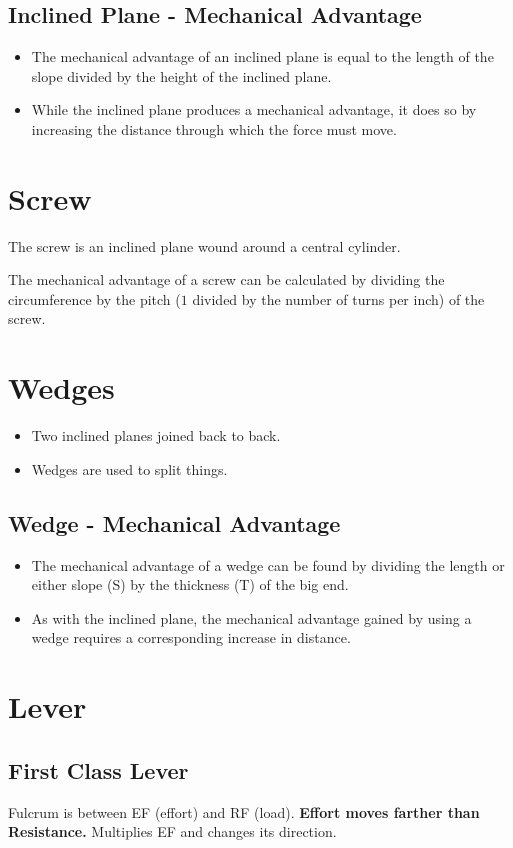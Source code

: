 \documentclass[12pt]{scrartcl}
\begin{document}
\subsection{Inclined Plane - Mechanical Advantage}
\begin{itemize}
    \item The mechanical advantage of an inclined plane is equal to the length of the slope divided by the height of the inclined plane.
    \item While the inclined plane produces a mechanical advantage, it does so by increasing the distance through which the force must move.
\end{itemize}
\section{Screw}
The screw is an inclined plane wound around a central cylinder.

\bigskip \noindent The mechanical advantage of a screw can be calculated by dividing the circumference by the pitch ($1$ divided by the number of turns per inch) of the screw.
\section{Wedges}
\begin{itemize}
    \item Two inclined planes joined back to back.
    \item Wedges are used to split things.
\end{itemize}
\subsection{Wedge - Mechanical Advantage}
\begin{itemize}
    \item The mechanical advantage of a wedge can be found by dividing the length or either slope (S) by the thickness (T) of the big end.
    \item As with the inclined plane, the mechanical advantage gained by using a wedge requires a corresponding increase in distance. 
\end{itemize}
\section{Lever}
\subsection{First Class Lever}
Fulcrum is between EF (effort) and RF (load). \textbf{Effort moves farther than Resistance.} Multiplies EF and changes its direction.
\end{document}
